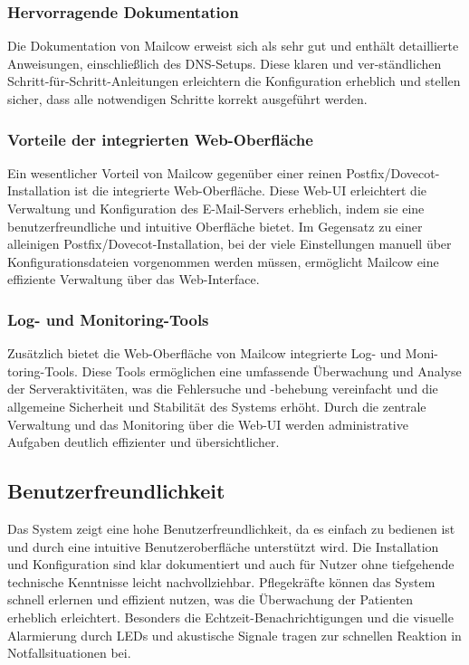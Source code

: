 \subsubsection{Hervorragende Dokumentation}
Die Dokumentation von Mailcow erweist sich als sehr gut und enthält detaillierte Anweisungen, einschließlich des DNS-Setups. Diese klaren und ver-ständlichen Schritt-für-Schritt-Anleitungen erleichtern die Konfiguration erheblich und stellen sicher, dass alle notwendigen Schritte korrekt ausgeführt werden.

\subsubsection{Vorteile der integrierten Web-Oberfläche}
Ein wesentlicher Vorteil von Mailcow gegenüber einer reinen Postfix/Dovecot-Installation ist die integrierte Web-Oberfläche. Diese Web-UI erleichtert die Verwaltung und Konfiguration des E-Mail-Servers erheblich, indem sie eine benutzerfreundliche und intuitive Oberfläche bietet. Im Gegensatz zu einer alleinigen Postfix/Dovecot-Installation, bei der viele Einstellungen manuell über Konfigurationsdateien vorgenommen werden müssen, ermöglicht Mailcow eine effiziente Verwaltung über das Web-Interface.

\subsubsection{Log- und Monitoring-Tools}
Zusätzlich bietet die Web-Oberfläche von Mailcow integrierte Log- und Moni-toring-Tools. Diese Tools ermöglichen eine umfassende Überwachung und Analyse der Serveraktivitäten, was die Fehlersuche und -behebung vereinfacht und die allgemeine Sicherheit und Stabilität des Systems erhöht. Durch die zentrale Verwaltung und das Monitoring über die Web-UI werden administrative Aufgaben deutlich effizienter und übersichtlicher.

\subsection{Benutzerfreundlichkeit}

Das System zeigt eine hohe Benutzerfreundlichkeit, da es einfach zu bedienen ist und durch eine intuitive Benutzeroberfläche unterstützt wird. Die Installation und Konfiguration sind klar dokumentiert und auch für Nutzer ohne tiefgehende technische Kenntnisse leicht nachvollziehbar. Pflegekräfte können das System schnell erlernen und effizient nutzen, was die Überwachung der Patienten erheblich erleichtert. Besonders die Echtzeit-Benachrichtigungen und die visuelle Alarmierung durch LEDs und akustische Signale tragen zur schnellen Reaktion in Notfallsituationen bei.

